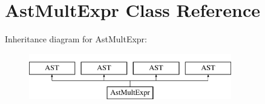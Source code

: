 \hypertarget{classAstMultExpr}{\section{Ast\-Mult\-Expr Class Reference}
\label{classAstMultExpr}
}
Inheritance diagram for Ast\-Mult\-Expr\-:\begin{figure}[H]
\begin{center}
\leavevmode
\includegraphics[height=2.000000cm]{classAstMultExpr}
\end{center}
\end{figure}

